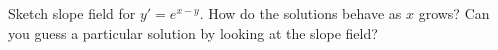 {Sketch slope field for $y'=e^{x-y}$.  How do the solutions behave as $x$
grows?  Can you guess a particular solution by looking at the slope
field?}
{
\begin{minipage}{\linewidth}
\end{minipage}
}